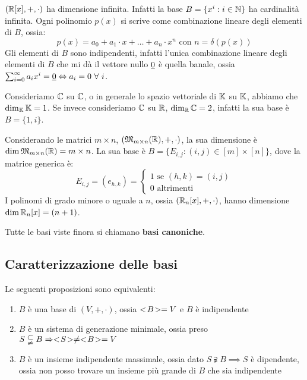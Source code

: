 \begin{exmp}
$(\mathbb{R}[x], +, \cdot)$ ha dimensione infinita. Infatti la base $B = \{ x^i : i \in \mathbb{N} \}$ ha cardinalit\`a infinita. Ogni polinomio $p(x)$ si scrive come combinazione lineare degli elementi di $B$, ossia:
\[
p(x) = a_0 + a_1 \cdot x + \dots + a_n \cdot x^n \text{ con } n = \delta(p(x))
\]
Gli elementi di $B$ sono indipendenti, infatti l'unica combinazione lineare degli elementi di $B$ che mi d\`a il vettore nullo $\underline{0}$ \`e quella banale, ossia $\sum_{i = 0}^{\infty} a_i x^i = \nullelement \iff a_i = 0 \forall i$.

Consideriamo $\mathbb{C}$ su $\mathbb{C}$, o in generale lo spazio vettoriale di $\mathbb{K}$ su $\mathbb{K}$, abbiamo che $\dim_{\mathbb{K}} \mathbb{K} = 1$. Se invece consideriamo $\mathbb{C}$ su $\mathbb{R}$, $\dim_{\mathbb{R}} \mathbb{C} = 2$, infatti la sua base \`e $B = \{ 1, i \}$.

Considerando le matrici $m \times n$, $\left(\mathfrak{M}_{m \times n}( \mathbb{R}), +, \cdot \right)$, la sua dimensione \`e $\dim \mathfrak{M}_{m \times n} (\mathbb{R}) = m \times n$. La sua base \`e $B = \{ E_{i,j} : (i,j) \in [m] \times [n] \}$, dove la matrice generica \`e:
\[
E_{i,j} = (e_{h,k}) = 
\begin{cases}
1 \text{ se } (h,k) = (i,j) \\
0 \text{ altrimenti}
\end{cases}
\]
I polinomi di grado minore o uguale a $n$, ossia $(\mathbb{R}_n [x], +, \cdot)$, hanno dimensione $\dim \mathbb{R}_n[x] = (n+1)$.

Tutte le basi viste finora si chiamano \textbf{basi canoniche}.
\end{exmp}

\subsection{Caratterizzazione delle basi}

Le seguenti proposizioni sono equivalenti:
\begin{enumerate}
    \item\label{itm:basi_equiv_1} $B$ \`e una base di $(V, +, \cdot)$, ossia $<\!{B}\!> = V$ e $B$ \`e indipendente
    \item\label{itm:basi_equiv_2} $B$ \`e un sistema di generazione minimale, ossia preso $S \subsetneqq B \Rightarrow <\!{S}\!> \neq <\!{B}\!> = V$
    \item\label{itm:basi_equiv_3} $B$ \`e un insieme indipendente massimale, ossia dato $S \supsetneqq B \implies S$ \`e dipendente, ossia non posso trovare un insieme pi\`u grande di $B$ che sia indipendente
\end{enumerate}

